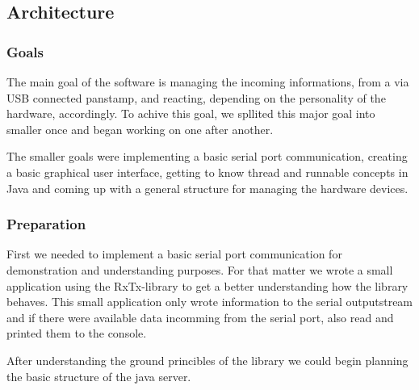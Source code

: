\subsection{Architecture}
\subsubsection{Goals}

The main goal of the software is managing the incoming informations, from a via USB connected panstamp, and reacting, depending on the personality of the hardware, accordingly. To achive this goal, we spllited this major goal into smaller once and began working on one after another.

 The smaller goals were implementing a basic serial port communication, creating a basic graphical user interface, getting to know thread and runnable concepts in Java and coming up with a general structure for managing the hardware devices.

\subsubsection{Preparation}
First we needed to implement a basic serial port communication for demonstration and understanding purposes. For that matter we wrote a small application using the RxTx-library to get a better understanding how the library behaves. This small application only wrote information to the serial outputstream and if there were available data incomming from the serial port, also read and printed them to the console.

After understanding the ground princibles of the library we could begin planning the basic structure of the java server.


